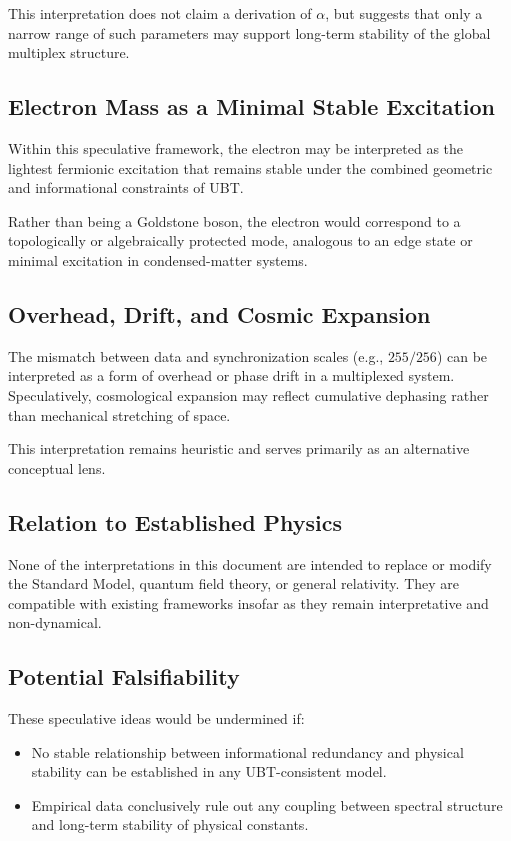 This interpretation does not claim a derivation of $\alpha$, but suggests that only
a narrow range of such parameters may support long-term stability of the global
multiplex structure.

\subsection*{Electron Mass as a Minimal Stable Excitation}

Within this speculative framework, the electron may be interpreted as the lightest
fermionic excitation that remains stable under the combined geometric and
informational constraints of UBT.

Rather than being a Goldstone boson, the electron would correspond to a
topologically or algebraically protected mode, analogous to an edge state or
minimal excitation in condensed-matter systems.

\subsection*{Overhead, Drift, and Cosmic Expansion}

The mismatch between data and synchronization scales (e.g., $255/256$) can be
interpreted as a form of overhead or phase drift in a multiplexed system.
Speculatively, cosmological expansion may reflect cumulative dephasing rather
than mechanical stretching of space.

This interpretation remains heuristic and serves primarily as an alternative
conceptual lens.

\subsection*{Relation to Established Physics}

None of the interpretations in this document are intended to replace or modify
the Standard Model, quantum field theory, or general relativity. They are compatible
with existing frameworks insofar as they remain interpretative and non-dynamical.

\subsection*{Potential Falsifiability}

These speculative ideas would be undermined if:
\begin{itemize}
\item No stable relationship between informational redundancy and physical stability
      can be established in any UBT-consistent model.
\item Empirical data conclusively rule out any coupling between spectral structure
      and long-term stability of physical constants.
\end{itemize}

